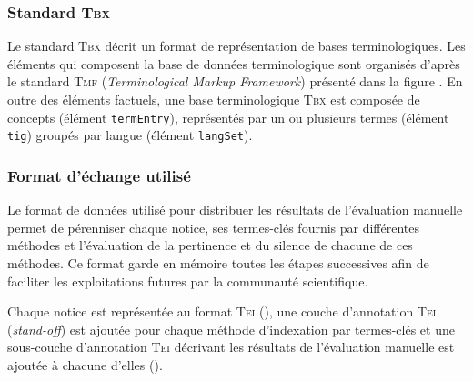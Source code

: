       \subsubsection{Standard \textsc{Tbx}}
      \label{subsubsec:main-automatic_evaluation_of_keyphrase_annotation-methodology-data_format-tbx}
        Le standard \textsc{Tbx} décrit un format de représentation de bases
        terminologiques. Les éléments qui composent la base de données
        terminologique sont organisés d'après le standard \textsc{Tmf}
        (\textit{Terminological Markup Framework}) présenté dans la figure
        . En outre des éléments
        factuels, une base terminologique \textsc{Tbx} est composée de concepts
        (élément \texttt{termEntry}), représentés par un ou plusieurs termes
        (élément \texttt{tig}) groupés par langue (élément \texttt{langSet}).


      \subsubsection{Format d'échange utilisé}
      \label{subsubsec:main-automatic_evaluation_of_keyphrase_annotation-methodology-data_format-final_format}
        Le format de données utilisé pour distribuer les résultats de
        l'évaluation manuelle permet de pérenniser chaque notice, ses
        termes-clés fournis par différentes méthodes et l'évaluation de la
        pertinence et du silence de chacune de ces méthodes. Ce format garde en
        mémoire toutes les étapes successives afin de faciliter les
        exploitations futures par la communauté scientifique.

        Chaque notice est représentée au format \textsc{Tei} (), une couche d'annotation
        \textsc{Tei} (\textit{stand-off}) est ajoutée pour chaque méthode
        d'indexation par termes-clés et une sous-couche d'annotation
        \textsc{Tei} décrivant les résultats de l'évaluation manuelle est
        ajoutée à chacune d'elles ().




